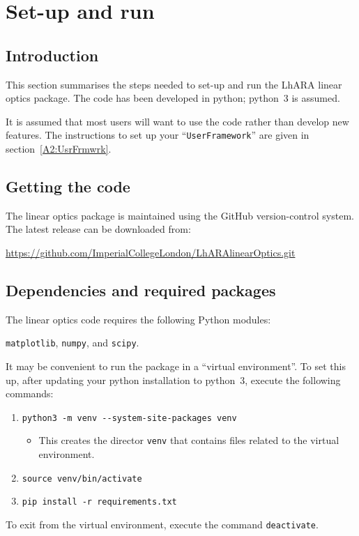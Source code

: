 \section{Set-up and run}

\subsection{Introduction}
This section summarises the steps needed to set-up and run
the LhARA linear optics package. 
The code has been developed in python; python~3 is assumed.

It is assumed that most users will want to use the code rather than
develop new features.
The instructions to set up your ``\texttt{UserFramework}'' are given
in section~\ref{A2:UsrFrmwrk}.

\subsection{Getting the code}
The linear optics package is maintained using the GitHub
version-control system.
The latest release can be downloaded from: \\
\begin{center}
  \href{https://github.com/ImperialCollegeLondon/LhARAlinearOptics.git}%
       {https://github.com/ImperialCollegeLondon/LhARAlinearOptics.git}
\end{center}

\subsection{Dependencies and required packages}
The linear optics code requires the following Python modules:
\begin{center}
  \verb+matplotlib+, \verb+numpy+, and \verb+scipy+.
\end{center}
It may be convenient to run the package in a ``virtual environment''.
To set this up, after updating your python installation to python~3,
execute the following commands:
\begin{enumerate}
  \item \verb+python3 -m venv --system-site-packages venv+
    \begin{itemize}
      \item This creates the director \verb+venv+ that contains files
        related to the virtual environment.
    \end{itemize}
  \item \verb+source venv/bin/activate+
  \item \verb+pip install -r requirements.txt+
\end{enumerate}
To exit from the virtual environment, execute the command
\verb+deactivate+.

